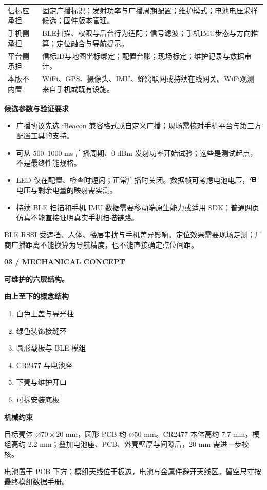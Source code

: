 \documentclass[UTF8,fontset=fandol,11pt]{ctexart}
\newcommand{\kicker}[1]{{\color{green}\small\bfseries #1}\par}
\newcommand{\titleline}[1]{{\LARGE\bfseries #1}\par\vspace{4mm}}
\newcommand{\note}[1]{\par\colorbox{green!8}{\parbox{\dimexpr\linewidth-2\fboxsep}{\small #1}}\par}
\begin{document}
\vspace{4mm}
\par
\begin{tabularx}{\linewidth}{@{}p{35mm}X@{}}\toprule
信标应承担 & 固定广播标识；发射功率与广播周期配置；维护模式；电池电压采样候选；固件版本管理。\\
手机侧承担 & BLE扫描、权限与后台行为适配；信号滤波；手机IMU步态与方向推算；定位融合与导航提示。\\
平台侧承担 & 信标ID与地图坐标绑定；配置台账；现场标定；维护记录与数据审计。\\
本版不内置 & WiFi、GPS、摄像头、IMU、蜂窝联网或持续在线网关。WiFi观测来自手机或既有设施。\\\bottomrule\end{tabularx}\par
\vspace{4mm}
\textbf{候选参数与验证要求}
\begin{itemize}
\item 广播协议先选 iBeacon 兼容格式或自定义广播；现场需核对手机平台与第三方配置工具的支持。
\item 可从 500--1000 ms 广播周期、0 dBm 发射功率开始试验；这些是测试起点，不是最终性能规格。
\item LED 仅在配置、检查时短闪；正常广播时关闭。数据帧可考虑电池电压，但电压与剩余电量的映射需实测。
\item 持续 BLE 扫描和手机 IMU 数据需要移动端原生能力或适用 SDK；普通网页仿真不能直接证明真实手机扫描链路。
\end{itemize}
\note{BLE RSSI 受遮挡、人体、楼层串扰与手机差异影响。定位效果需要现场走测；厂商广播距离不能换算为导航精度，也不能直接确定点位间距。}
\newpage
\kicker{03 / MECHANICAL CONCEPT}\titleline{可维护的六层结构。}
\begin{minipage}[t]{0.35\linewidth}\vspace{0pt}
\textbf{由上至下的概念结构}
\begin{enumerate}[leftmargin=1.4em,itemsep=8pt]
\item 白色上盖与导光柱
\item 绿色装饰接缝环
\item 圆形载板与 BLE 模组
\item CR2477 与电池座
\item 下壳与维护开口
\item 可拆安装底板
\end{enumerate}
\textbf{机械约束}

目标壳体 $\varnothing70\times20$ mm，圆形 PCB 约 $\varnothing50$ mm。CR2477 本体高约 7.7 mm，模组高约 2.2 mm；叠加电池座、PCB、外壳壁厚与间隙后，20 mm 需进一步校核。

电池置于 PCB 下方；模组天线位于板边，电池与金属件避开天线区。留空尺寸按最终模组数据手册。
\end{minipage}\hfill
\end{document}

